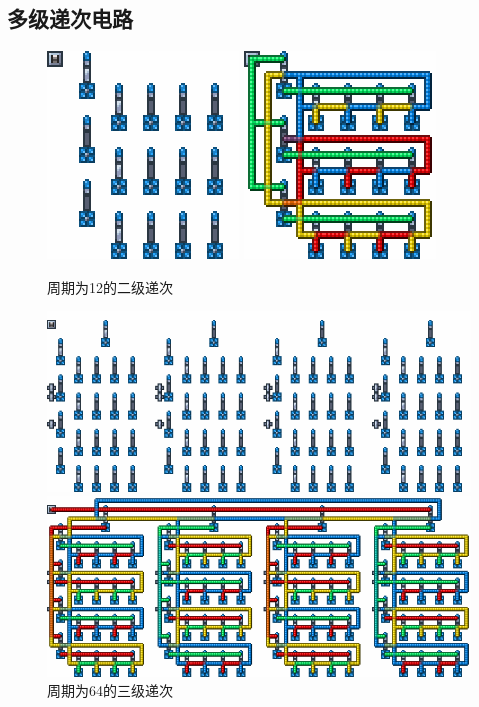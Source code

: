 \subsection{多级递次电路}
\begin{figure}
    \centering
    \includegraphics{images/313.png}
    \qquad
    \includegraphics{images/314.png}
    \caption{周期为12的二级递次}
\end{figure}
\begin{figure}
    \centering
    \includegraphics[width=\textwidth]{images/316.png}
    
    \includegraphics[width=\textwidth]{images/315.png}
    \caption{周期为64的三级递次}
\end{figure}
